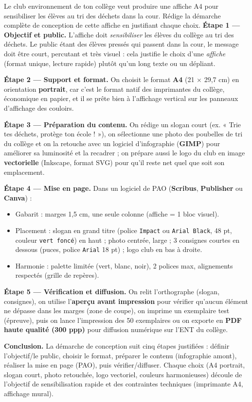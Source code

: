 \documentclass[11pt]{article}
\begin{document}
\begin{exoresolu}
Le club environnement de ton collège veut produire une affiche A4 pour sensibiliser les élèves au tri des déchets dans la cour. Rédige la démarche complète de conception de cette affiche en justifiant chaque choix.
\tcblower
\textbf{Étape 1 — Objectif et public.} L'affiche doit \emph{sensibiliser} les élèves du collège au tri des déchets. Le public étant des élèves pressés qui passent dans la cour, le message doit être court, percutant et très visuel : cela justifie le choix d'une \emph{affiche} (format unique, lecture rapide) plutôt qu'un long texte ou un dépliant.

\textbf{Étape 2 — Support et format.} On choisit le format \textbf{A4} (21 $\times$ 29,7 cm) en orientation \textbf{portrait}, car c'est le format natif des imprimantes du collège, économique en papier, et il se prête bien à l'affichage vertical sur les panneaux d'affichage des couloirs.

\textbf{Étape 3 — Préparation du contenu.} On rédige un slogan court (ex. « Trie tes déchets, protège ton école ! »), on sélectionne une photo des poubelles de tri du collège et on la retouche avec un logiciel d'infographie (\textbf{GIMP}) pour améliorer sa luminosité et la recadrer ; on prépare aussi le logo du club en image \textbf{vectorielle} (Inkscape, format SVG) pour qu'il reste net quel que soit son emplacement.

\textbf{Étape 4 — Mise en page.} Dans un logiciel de PAO (\textbf{Scribus}, \textbf{Publisher} ou \textbf{Canva}) :
\begin{itemize}
\item Gabarit : marges 1,5 cm, une seule colonne (affiche = 1 bloc visuel).
\item Placement : slogan en grand titre (police \texttt{Impact} ou \texttt{Arial Black}, 48 pt, couleur \texttt{vert foncé}) en haut ; photo centrée, large ; 3 consignes courtes en dessous (puces, police \texttt{Arial} 18 pt) ; logo club en bas à droite.
\item Harmonie : palette limitée (vert, blanc, noir), 2 polices max, alignements respectés (grille de repères).
\end{itemize}

\textbf{Étape 5 — Vérification et diffusion.} On relit l'orthographe (slogan, consignes), on utilise l'\textbf{aperçu avant impression} pour vérifier qu'aucun élément ne dépasse dans les marges (zone de coupe), on imprime un exemplaire test (épreuve), puis on lance l'impression des 50 exemplaires ou on exporte en \textbf{PDF haute qualité (300 ppp)} pour diffusion numérique sur l'ENT du collège.

\textbf{Conclusion.} La démarche de conception suit cinq étapes justifiées : définir l'objectif/le public, choisir le format, préparer le contenu (infographie amont), réaliser la mise en page (PAO), puis vérifier/diffuser. Chaque choix (A4 portrait, slogan court, photo retouchée, logo vectoriel, couleurs harmonieuses) découle de l'objectif de sensibilisation rapide et des contraintes techniques (imprimante A4, affichage mural).
\end{exoresolu}
\end{document}
